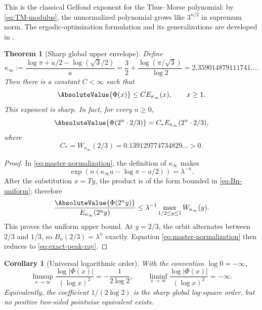 \documentclass[11pt,oneside]{article}
\newtheorem{theorem}{Theorem}[section]
\newtheorem{corollary}[corollary]{Corollary}
\theoremstyle{definition}
\theoremstyle{remark}
\newcommand{\Phiup}{\Phi}
\begin{document}
This is the classical Gelfond exponent for the Thue--Morse polynomial: by
\eqref{eq:TM-modulus}, the unnormalized polynomial grows like $3^{n/2}$ in supremum norm.
The ergodic-optimization formulation and its generalizations are developed in
\cite{fan-schmeling-shen}.

\begin{theorem}[Sharp global upper envelope]
\label{thm:uniform-envelope}
Define
\begin{equation}
 \boxed{\displaystyle
 \kappa_\infty
 :=\frac{\log\pi+a/2-\log(\sqrt3/2)}{a}
 =\frac32+\frac{\log(\pi/\sqrt3)}{\log2}
 =2.359014879111741\ldots .}
 \label{eq:kappa-infty}
\end{equation}
Then there is a constant $C<\infty$ such that
\begin{equation}
 \AbsoluteValue{\Phiup(x)}\le C E_{\kappa_\infty}(x),
 \qquad x\ge1.
 \label{eq:uniform-envelope}
\end{equation}
This exponent is sharp.  In fact, for every $n\ge0$,
\begin{equation}
 \AbsoluteValue{\Phiup(2^n\cdot2/3)}
 =C_*E_{\kappa_\infty}(2^n\cdot2/3),
 \label{eq:exact-peak-ray}
\end{equation}
where
\begin{equation}
 C_*=W_{\kappa_\infty}(2/3)
 =0.139129774734829\ldots>0.
 \label{eq:Cstar}
\end{equation}
\end{theorem}

\begin{proof}
In \eqref{eq:master-normalization}, the definition of $\kappa_\infty$ makes
\[
 \exp(n(\kappa_\infty a-\log\pi-a/2))=\lambda^{-n}.
\]
After the substitution $x=Ty$, the product is of the form bounded in
\eqref{eq:Bn-uniform}; therefore
\[
 \frac{\AbsoluteValue{\Phiup(2^ny)}}{E_{\kappa_\infty}(2^ny)}
 \le\lambda^{-1}\max_{1/2\le y\le1}W_{\kappa_\infty}(y).
\]
This proves the uniform upper bound.  At $y=2/3$, the orbit alternates between $2/3$ and
$1/3$, so $B_n(2/3)=\lambda^n$ exactly.  Equation
\eqref{eq:master-normalization} then reduces to \eqref{eq:exact-peak-ray}.
\end{proof}

\begin{corollary}[Universal logarithmic order]
\label{cor:universal-log-order}
With the convention $\log0=-\infty$,
\begin{equation}
 \limsup_{x\to\infty}\frac{\log|\Phiup(x)|}{(\log x)^2}
 =-\frac1{2\log2},
 \qquad
 \liminf_{x\to\infty}\frac{\log|\Phiup(x)|}{(\log x)^2}=-\infty.
 \label{eq:universal-log-order}
\end{equation}
Equivalently, the coefficient $1/(2\log2)$ is the sharp global log-square order, but no
positive two-sided pointwise equivalent exists.
\end{corollary}
\end{document}
